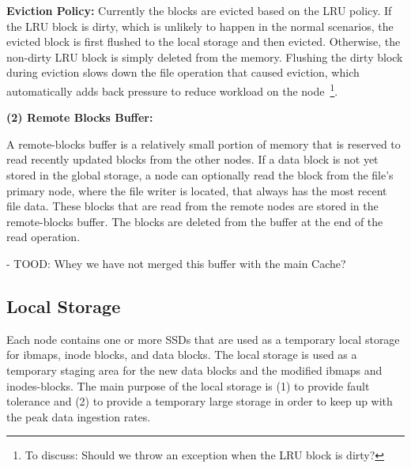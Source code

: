 \documentclass[]{article}
\newcommand{\subtopic}[1]{\vspace{1.5pt} \noindent \textbf{#1}}
\begin{document}
\subtopic{Eviction Policy:} Currently the blocks are evicted based on the LRU
policy.  If the LRU block is dirty, which is unlikely to happen in the normal
scenarios, the evicted block is first flushed to the local storage and then
evicted. Otherwise, the non-dirty LRU block is simply deleted from the memory.
Flushing the dirty block during eviction  slows down the file operation that
caused eviction, which automatically adds back pressure to reduce workload on
the node~\footnote{To discuss: Should we throw an exception when the LRU block 
is dirty?}.


\subtopic{(2) Remote Blocks Buffer:}

A remote-blocks buffer is a relatively small
portion of memory that is reserved to read recently updated blocks from the
other nodes.  If a data block is not yet stored in the global storage, a node
can optionally read the block from the file's primary node, where the file
writer is located, that always has the most recent file data. These blocks 
that are read from the remote nodes are stored in the remote-blocks buffer.  
The blocks are deleted from the buffer at the end of the read operation.


- TOOD: Whey we have not merged this buffer with the main Cache?



%
%
%
%

\subsection{Local Storage} Each node contains one or more SSDs that are used as
a temporary local storage for ibmaps, inode blocks, and data blocks.  The local
storage is used as a temporary staging area for the new data blocks and the
modified ibmaps and inodes-blocks.  The main purpose of the local storage is
(1) to provide fault tolerance and (2) to provide a temporary large storage in
order to keep up with the peak data ingestion rates.
\end{document}

